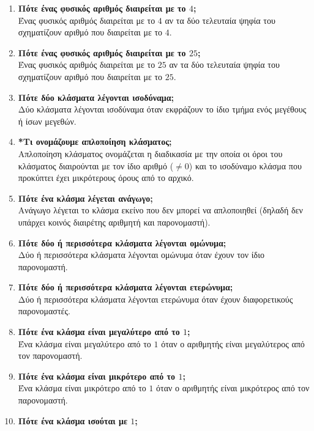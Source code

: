 \documentclass[a4paper,11pt]{report}
\begin{document}
\begin{enumerate}
\item \textbf{Πότε ένας φυσικός αριθμός διαιρείται με το $4$;}\\
      Ένας φυσικός αριθμός διαιρείται με το $4$ αν τα δύο τελευταία ψηφία του σχηματίζουν αριθμό που 
      διαιρείται με το $4$.
\item \textbf{Πότε ένας φυσικός αριθμός διαιρείται με το $25$;}\\
      Ένας φυσικός αριθμός διαιρείται με το $25$ αν τα δύο τελευταία ψηφία του σχηματίζουν αριθμό που 
      διαιρείται με το $25$.
\item \textbf{Πότε δύο κλάσματα λέγονται ισοδύναμα;}\\
       Δύο κλάσματα λέγονται ισοδύναμα όταν εκφράζουν το ίδιο τμήμα ενός μεγέθους ή ίσων μεγεθών.
\item \textbf{*Τι ονομάζουμε απλοποίηση κλάσματος; }\\
       Απλοποίηση κλάσματος ονομάζεται η διαδικασία με την οποία οι όροι του κλάσματος διαιρούνται με τον 
       ίδιο αριθμό ($\neq 0$) και το ισοδύναμο κλάσμα που προκύπτει έχει μικρότερους όρους από το αρχικό.
\item \textbf{Πότε ένα κλάσμα λέγεται ανάγωγο;}\\
       Ανάγωγο λέγεται το κλάσμα εκείνο που δεν μπορεί να απλοποιηθεί (δηλαδή δεν υπάρχει κοινός διαιρέτης 
       αριθμητή και παρονομαστή).
\item \textbf{Πότε δύο ή περισσότερα κλάσματα λέγονται ομώνυμα;}\\
      Δύο ή περισσότερα κλάσματα λέγονται ομώνυμα όταν έχουν τον ίδιο παρονομαστή.
\item \textbf{Πότε δύο ή περισσότερα κλάσματα λέγονται ετερώνυμα;}\\
       Δύο ή περισσότερα κλάσματα λέγονται ετερώνυμα όταν έχουν διαφορετικούς παρονομαστές.
\item \textbf{Πότε ένα κλάσμα είναι μεγαλύτερο από το $1$;}\\
       Ένα κλάσμα είναι μεγαλύτερο από το $1$ όταν ο αριθμητής είναι μεγαλύτερος από τον παρονομαστή.
\item \textbf{Πότε ένα κλάσμα είναι μικρότερο από το $1$;}\\
       Ένα κλάσμα είναι μικρότερο από το $1$ όταν ο αριθμητής είναι μικρότερος από τον παρονομαστή.
\item \textbf{Πότε ένα κλάσμα ισούται με $1$;}\\

\end{enumerate}
\end{document}
